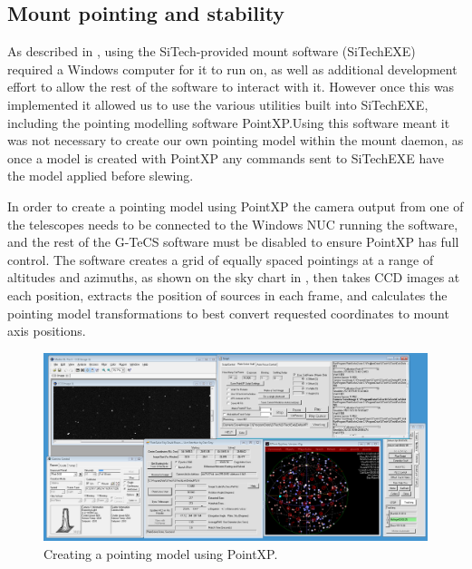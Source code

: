 \subsection{Mount pointing and stability}
\label{sec:pointxp}
\begin{colsection}

As described in , using the SiTech-provided mount software (SiTechEXE) required a Windows computer for it to run on, as well as additional development effort to allow the rest of the software to interact with it. However once this was implemented it allowed us to use the various utilities built into SiTechEXE, including the pointing modelling software PointXP.\@ Using this software meant it was not necessary to create our own pointing model within the mount daemon, as once a model is created with PointXP any commands sent to SiTechEXE have the model applied before slewing.

In order to create a pointing model using PointXP the camera output from one of the telescopes needs to be connected to the Windows NUC running the software, and the rest of the G-TeCS software must be disabled to ensure PointXP has full control. The software creates a grid of equally spaced pointings at a range of altitudes and azimuths, as shown on the sky chart in , then takes CCD images at each position, extracts the position of sources in each frame, and calculates the pointing model transformations to best convert requested coordinates to mount axis positions.

\begin{figure}[t]
    \begin{center}
        \includegraphics[width=0.8\linewidth]{images/pointing_model.png}
    \end{center}
    \caption[Creating a pointing model using PointXP]{
        Creating a pointing model using PointXP.\@
    }\label{fig:pointing_model}
\end{figure}


\end{colsection}

